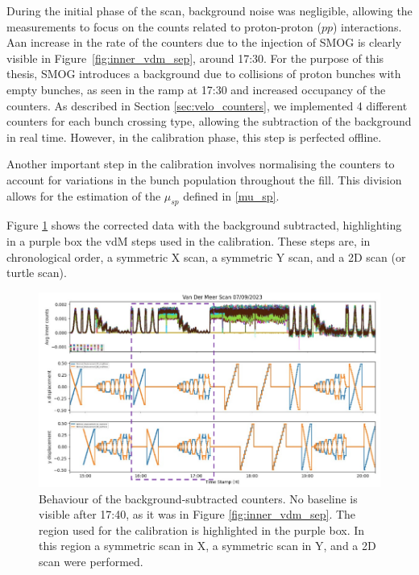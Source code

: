 During the initial phase of the scan, background noise was negligible, allowing the measurements to focus on the counts related to proton-proton ($pp$) interactions. Aan increase in the rate of the counters due to the injection of SMOG is clearly visible in Figure~\ref{fig:inner_vdm_sep}, around 17:30.  For the purpose of this thesis, SMOG introduces a background due to collisions of proton bunches with empty bunches, as seen in the ramp at 17:30 and increased occupancy of the counters.  As described in Section \ref{sec:velo_counters}, we implemented 4 different counters for each bunch crossing type, allowing the subtraction of the background in real time. However, in the calibration phase, this step is perfected offline. 

Another important step in the calibration involves normalising the counters to account for variations in the bunch population throughout the fill. This division allows for the estimation of the $\mu_{sp}$ defined in \eqref{mu_sp}. 

Figure \ref{fig:bkg_sub_calib} shows the corrected data with the background subtracted, highlighting in a purple box the vdM steps used in the calibration. These steps are, in chronological order, a symmetric X scan, a symmetric Y scan, and a 2D scan (or turtle scan). 

\begin{figure}
    \centering
    \includegraphics[width=\textwidth]{figures/calibration_period.png}
    \caption{Behaviour of the background-subtracted counters. No baseline is visible after 17:40, as it was in Figure \ref{fig:inner_vdm_sep}. The region used for the calibration is highlighted in the purple box. In this region a symmetric scan in X, a symmetric scan in Y, and a 2D scan were performed.}
    \label{fig:bkg_sub_calib}
\end{figure}

